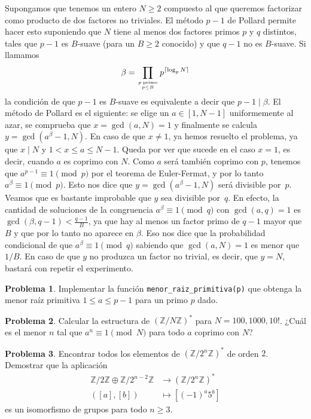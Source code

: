 \documentclass[a4paper, 11pt]{article}
\newcommand{\ZZ}{\mathbb{Z}}
\newcounter{numerodetema}
\theoremstyle{plain}
\theoremstyle{definition}
\newtheorem{prob}{Problema}[numerodetema]
\newcommand\myatop[2]{\genfrac{}{}{0pt}{}{#1}{#2}}
\begin{document}
Supongamos que tenemos un entero $N\geq 2$ compuesto al que queremos factorizar
como producto de dos factores no triviales. El método $p-1$ de Pollard permite
hacer esto suponiendo que $N$ tiene al menos dos factores primos $p$ y $q$
distintos, tales que $p-1$ es $B$-suave (para un $B\geq2$ conocido) y que $q-1$
no es $B$-suave. Si llamamos
\[
   \beta=\prod_{\myatop{p\;\text{primo}}{p\leq B}}p^{\lceil\log_pN\rceil}
\]
la condición de que $p-1$ es $B$-suave es equivalente a decir que $p-1\mid\beta$.
El método de Pollard es el siguiente: se elige un $a\in[1,N-1]$ uniformemente al
azar, se comprueba que $x=\gcd(a,N)=1$ y finalmente se calcula
$y=\gcd(a^{\beta}-1,N)$. En caso de que $x\neq 1$, ya hemos resuelto el
problema, ya que $x\mid N$ y $1<x\leq a\leq N-1$. Queda por ver que sucede en
el caso $x=1$, es decir, cuando $a$ es coprimo con $N$. Como $a$ será también
coprimo con $p$, tenemos que $a^{p-1}\equiv1\pmod{p}$ por el teorema de
Euler-Fermat, y por lo tanto $a^{\beta}\equiv1\pmod{p}$. Esto nos
dice que $y=\gcd(a^{\beta}-1,N)$ será divisible por~$p$. Veamos que es
bastante improbable que $y$ sea divisible por~$q$. En efecto, la cantidad de
soluciones de la congruencia $a^\beta\equiv1\pmod{q}$ con $\gcd(a,q)=1$ es
$\gcd(\beta,q-1)<\frac{q-1}B$, ya que hay al menos un factor primo de
$q-1$ mayor que $B$ y que por lo tanto no aparece en $\beta$. Eso nos dice que
la probabilidad condicional de que $a^\beta\equiv1\pmod{q}$ sabiendo que
$\gcd(a,N)=1$ es menor que $1/B$. En caso de que $y$ no produzca un factor
no trivial, es decir, que $y=N$, bastará con repetir el experimento.

\begin{prob}\label{prob-menor-rp}
Implementar la función \texttt{menor\_raiz\_primitiva(p)} que obtenga la
menor raíz primitiva $1\leq a\leq p-1$ para un primo $p$ dado.
\end{prob}

\begin{prob}
Calcular la estructura de $(\ZZ/N\ZZ)^*$ para $N=100, 1000, 10!$. ¿Cuál es
el menor $n$ tal que $a^n\equiv 1\pmod{N}$ para todo $a$ coprimo con $N$?
\end{prob}

\begin{prob}
Encontrar todos los elementos de $(\ZZ/2^n\ZZ)^*$ de orden $2$. Demostrar
que la aplicación
\[
\begin{aligned}
\ZZ/2\ZZ\oplus\ZZ/2^{n-2}\ZZ & \rightarrow(\ZZ/2^n\ZZ)^* \\
([a],[b]) & \mapsto [(-1)^a5^b]
\end{aligned}
\]
es un isomorfismo de grupos para todo $n\geq 3$.
\end{prob}
\end{document}
